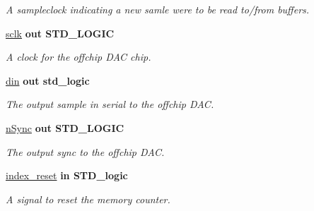 \begin{DoxyCompactItemize}
\begin{DoxyCompactList}\small\item\em A sampleclock indicating a new samle were to be read to/from buffers. \end{DoxyCompactList}\item 
\hypertarget{classdacTop_a6d01fe70bfcd66f305c9c962331782cd}{\hyperlink{classdacTop_a6d01fe70bfcd66f305c9c962331782cd}{sclk}  {\bfseries {\bfseries \textcolor{vhdlkeyword}{out}\textcolor{vhdlchar}{ }}} {\bfseries \textcolor{comment}{S\-T\-D\-\_\-\-L\-O\-G\-I\-C}\textcolor{vhdlchar}{ }} }\label{classdacTop_a6d01fe70bfcd66f305c9c962331782cd}

\begin{DoxyCompactList}\small\item\em A clock for the offchip D\-A\-C chip. \end{DoxyCompactList}\item 
\hypertarget{classdacTop_a85ffcdebe13d1f5ddc75d9dc2718accd}{\hyperlink{classdacTop_a85ffcdebe13d1f5ddc75d9dc2718accd}{din}  {\bfseries {\bfseries \textcolor{vhdlkeyword}{out}\textcolor{vhdlchar}{ }}} {\bfseries \textcolor{comment}{std\-\_\-logic}\textcolor{vhdlchar}{ }} }\label{classdacTop_a85ffcdebe13d1f5ddc75d9dc2718accd}

\begin{DoxyCompactList}\small\item\em The output sample in serial to the offchip D\-A\-C. \end{DoxyCompactList}\item 
\hypertarget{classdacTop_acb508fc1279abe4c1bc2be47e4dd526b}{\hyperlink{classdacTop_acb508fc1279abe4c1bc2be47e4dd526b}{n\-Sync}  {\bfseries {\bfseries \textcolor{vhdlkeyword}{out}\textcolor{vhdlchar}{ }}} {\bfseries \textcolor{comment}{S\-T\-D\-\_\-\-L\-O\-G\-I\-C}\textcolor{vhdlchar}{ }} }\label{classdacTop_acb508fc1279abe4c1bc2be47e4dd526b}

\begin{DoxyCompactList}\small\item\em The output sync to the offchip D\-A\-C. \end{DoxyCompactList}\item 
\hypertarget{classdacTop_a5a1c2c67d9bb87333434aa5bbc7217ac}{\hyperlink{classdacTop_a5a1c2c67d9bb87333434aa5bbc7217ac}{index\-\_\-reset}  {\bfseries {\bfseries \textcolor{vhdlkeyword}{in}\textcolor{vhdlchar}{ }}} {\bfseries \textcolor{comment}{S\-T\-D\-\_\-logic}\textcolor{vhdlchar}{ }} }\label{classdacTop_a5a1c2c67d9bb87333434aa5bbc7217ac}

\begin{DoxyCompactList}\small\item\em A signal to reset the memory counter. \end{DoxyCompactList}\end{DoxyCompactItemize}


